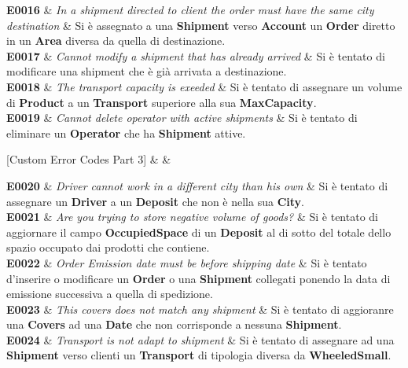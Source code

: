 {  \textbf{E0016} &
  {\footnotesize
    \textit{In a shipment directed to client the order must have the same city destination}
  } &
  {\footnotesize
    Si è assegnato a una \textbf{Shipment} verso \textbf{Account} un \textbf{Order} diretto in un \textbf{Area} diversa da quella di destinazione.} \\

  \textbf{E0017} &
  {\footnotesize
    \textit{Cannot modify a shipment that has already arrived} } &
  {\footnotesize
    Si è tentato di modificare una shipment che è già arrivata a destinazione.} \\

  \textbf{E0018} &
  {\footnotesize
    \textit{The transport capacity is exeeded} } &
  {\footnotesize
    Si è tentato di assegnare un volume di \textbf{Product} a un \textbf{Transport} superiore alla sua \textbf{MaxCapacity}.} \\

  \textbf{E0019} &
  {\footnotesize
    \textit{Cannot delete operator with active shipments} } &
  {\footnotesize
    Si è tentato di eliminare un \textbf{Operator} che ha \textbf{Shipment} attive.} \\

}

[Custom Error Codes Part 3]{ &  & }{

\textbf{E0020} &
{\footnotesize
  \textit{Driver cannot work in a different city than his own} } &
{\footnotesize
  Si è tentato di assegnare un \textbf{Driver} a un \textbf{Deposit} che non è nella sua \textbf{City}.} \\

\textbf{E0021} &
{\footnotesize
  \textit{Are you trying to store negative volume of goods?} } &
{\footnotesize
  Si è tentato di aggiornare il campo \textbf{OccupiedSpace} di un \textbf{Deposit} al di sotto del totale dello spazio occupato dai prodotti che contiene.} \\

\textbf{E0022} &
  \textit{Order Emission date must be before shipping date} & 
{\footnotesize
  Si è tentato d'inserire o modificare un \textbf{Order} o una \textbf{Shipment} collegati ponendo la data di emissione successiva a quella di spedizione.} \\

\textbf{E0023} &
  {\footnotesize
    \textit{This covers does not match any shipment} } &
  {\footnotesize
    Si è tentato di aggioranre una \textbf{Covers} ad una \textbf{Date} che non corrisponde a nessuna \textbf{Shipment}.} \\

\textbf{E0024} &
  {\footnotesize
    \textit{Transport is not adapt to shipment} } &
  {\footnotesize
    Si è tentato di assegnare ad una \textbf{Shipment} verso clienti un \textbf{Transport} di tipologia diversa da \textbf{WheeledSmall}.} \\
}

